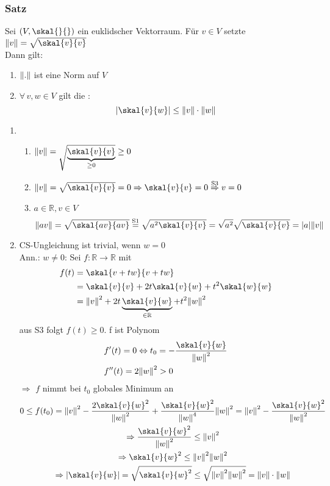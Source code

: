 \subsubsection[Cauchy-Schwarz-Ungleichung]{Satz} %
\label{ssub:satz}
Sei $(V,\skal{}{})$ ein euklidscher Vektorraum. Für $v \in V$ setzte $\norm{v}=\sqrt{\skal{v}{v}}$ \\ Dann gilt:
\begin{enumerate}
	\item $\norm{.}$ ist eine Norm auf $ V$ 
	\item $\forall\, v,w \in V$ gilt die :
	\[
		|\skal{v}{w}| \leq \norm{v} \cdot \norm{w}
	\]  
\end{enumerate}
\begin{enumerate}
	\item \begin{enumerate}[N1:]
		\item $\norm{v}=\sqrt{\underset{\geq 0}{\underbrace{\skal{v}{v}}}} \geq  0$
		\item $\norm{v}=\sqrt{\skal{v}{v}}=0 \Rightarrow \skal{v}{v}=0 \stackrel{\text{S3}}{\Rightarrow} v=0$ 
		\item $a \in \mathbb{R} , v \in V$ \[
			\norm{av}=\sqrt{\skal{av}{av}} \stackrel{\text{S1}}{=} \sqrt{a^2 \skal{v}{v}} = \sqrt{a^2} \sqrt{\skal{v}{v}} = \abs{a} \norm{v}
		\] 
	\end{enumerate}
	\item CS-Ungleichung ist trivial, wenn $w=0$ \\
	Ann.: $w \neq 0$: Sei $f:\mathbb{R} \to \mathbb{R} $ mit
	\begin{align*}
		f(t) &=\skal{v+tw}{v+tw} \\
		& = \skal{v}{v} +2t \skal{v}{w} + t^2 \skal{w}{w} \\
		& = \norm{v}^2+ 2t \underbrace{\skal{v}{w}}_{\in \mathbb{R}} + t^2 \norm{w}^2 
	\end{align*} 
	aus S3 folgt $f(t)\geq 0$. f ist Polynom
	\begin{align*}
		&f'(t)=0 \Leftrightarrow t_0 = - \frac{\skal{v}{w}}{\norm{w}^2} \\
		&f''(t)=2 \norm{w}^2 > 0
	\end{align*}
 $\Rightarrow$ $f$ nimmt bei $t_0$ globales Minimum an
 \begin{gather*}
 	0 \leq f(t_0)=\norm{v}^2 - \frac{2 \skal{v}{w}^2}{\norm{w}^2} + \frac{\skal{v}{w}^2}{\norm{w}^4} \norm{w}^2 = \norm{v}^2 - \frac{\skal{v}{w}^2}{\norm{w}^2} \\
	\Rightarrow \frac{\skal{v}{w}^2}{\norm{w}^2} \leq \norm{v}^2 \\ \Rightarrow \skal{v}{w}^2 \leq \norm{v}^2 \norm{w}^2 \\
	\Rightarrow \abs{\skal{v}{w}} = \sqrt{\skal{v}{w}^2} \leq \sqrt{\norm{v}^2 \norm{w}^2} = \norm{v} \cdot \norm{w}
 \end{gather*}
 \bewende
\end{enumerate}
